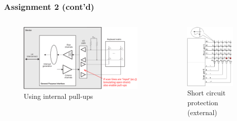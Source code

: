 \documentclass[aspectratio=169,usenames,dvipsnames]{beamer}
\newcounter{cont}
\begin{document}
\begin{frame}
  \frametitle{Assignment 2 (cont'd)}
  \vspace*{-5mm}
  \begin{columns}
      \begin{figure}
        \centering
        \includegraphics[scale=0.23]{images/keypad-scan2.png}
        \caption{Using internal pull-ups}
      \end{figure}
      \begin{figure}
        \centering
        \includegraphics[scale=0.4]{images/keypad-scan1.png}
        \caption{Short circuit protection (external)}
      \end{figure}
  \end{columns}
  \vspace*{-10mm}
\end{frame}
\end{document}
